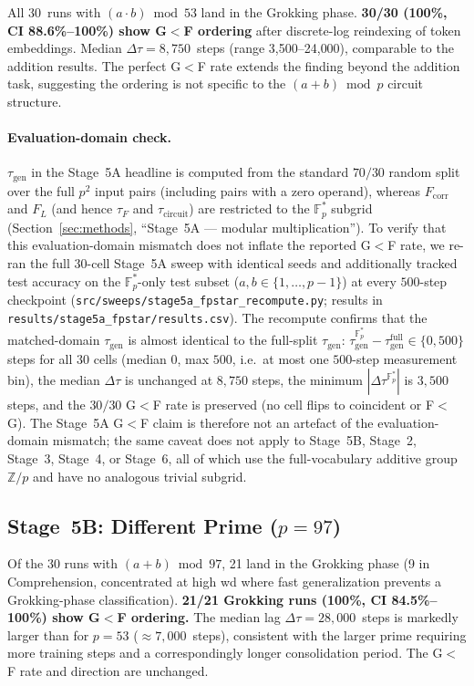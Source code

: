 \documentclass{article}
\newcommand{\taug}{\tau_{\mathrm{gen}}}
\newcommand{\tauf}{\tau_{F}}
\newcommand{\taucirc}{\tau_{\mathrm{circuit}}}
\newcommand{\Dtau}{\Delta\tau}
\newcommand{\fcorr}{F_{\mathrm{corr}}}
\newcommand{\flogit}{F_{L}}
\begin{document}
All 30~runs with $(a\cdot b)\bmod 53$ land in the Grokking phase.
\textbf{30/30 (100\%, CI 88.6\%--100\%) show G$<$F ordering} after
discrete-log reindexing of token embeddings.
Median $\Dtau = 8{,}750$~steps (range 3{,}500--24{,}000), comparable
to the addition results.
The perfect G$<$F rate extends the finding beyond the addition task,
suggesting the ordering is not specific to the $(a+b)\bmod p$ circuit
structure.

\paragraph{Evaluation-domain check.}
$\taug$ in the Stage~5A headline is computed from the standard
$70/30$ random split over the full $p^{2}$ input pairs (including
pairs with a zero operand), whereas $\fcorr$ and $\flogit$ (and
hence $\tauf$ and $\taucirc$) are restricted to the
$\mathbb{F}_p^*$ subgrid
(Section~\ref{sec:methods}, ``Stage~5A --- modular multiplication'').
To verify that this evaluation-domain mismatch does not inflate
the reported G$<$F rate, we re-ran the full $30$-cell Stage~5A
sweep with identical seeds and additionally tracked test accuracy
on the $\mathbb{F}_p^*$-only test subset
($a, b \in \{1, \dots, p-1\}$) at every $500$-step checkpoint
(\texttt{src/sweeps/stage5a\_fpstar\_recompute.py};
results in \texttt{results/stage5a\_fpstar/results.csv}).
The recompute confirms that the matched-domain $\taug$ is almost
identical to the full-split $\taug$:
$\tau_{\mathrm{gen}}^{\mathbb{F}_p^*}-\tau_{\mathrm{gen}}^{\mathrm{full}}
\in\{0, 500\}$ steps for all $30$ cells (median $0$, max $500$,
i.e.\ at most one $500$-step measurement bin), the median
$\Dtau$ is unchanged at $8{,}750$ steps, the minimum
$|\Dtau^{\mathbb{F}_p^*}|$ is $3{,}500$ steps, and the
$30/30$ G$<$F rate is preserved (no cell flips to coincident or
F$<$G).
The Stage~5A G$<$F claim is therefore not an artefact of the
evaluation-domain mismatch; the same caveat does not apply to
Stage~5B, Stage~2, Stage~3, Stage~4, or Stage~6, all of which use
the full-vocabulary additive group $\mathbb{Z}/p$ and have no
analogous trivial subgrid.

\subsection{Stage~5B: Different Prime (\texorpdfstring{$p{=}97$}{p=97})}
\label{sec:results_p97}

Of the 30 runs with $(a+b)\bmod 97$, 21 land in the Grokking phase
(9 in Comprehension, concentrated at high wd where fast generalization
prevents a Grokking-phase classification).
\textbf{21/21 Grokking runs (100\%, CI 84.5\%--100\%) show G$<$F
ordering.}
The median lag $\Dtau = 28{,}000$~steps is markedly larger than for
$p{=}53$ ($\approx7{,}000$~steps), consistent with the larger prime
requiring more training steps and a correspondingly longer
consolidation period.
The G$<$F rate and direction are unchanged.
\end{document}
